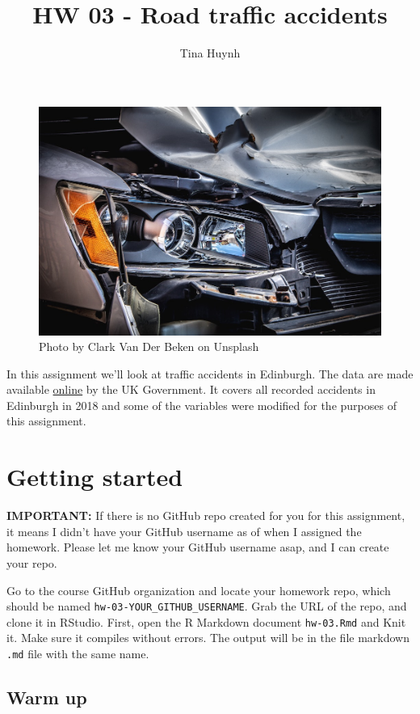 \documentclass[
]{article}
\title{HW 03 - Road traffic accidents}
\author{Tina Huynh}
\date{}
\begin{document}
\maketitle

{
\setcounter{tocdepth}{2}
\tableofcontents
}
\begin{figure}
\includegraphics[width=0.8\linewidth]{img/accident} \caption{Photo by Clark Van Der Beken on Unsplash}\label{fig:photo}
\end{figure}

In this assignment we'll look at traffic accidents in Edinburgh. The
data are made available
\href{https://data.gov.uk/dataset/cb7ae6f0-4be6-4935-9277-47e5ce24a11f/road-safety-data/datafile/36f1658e-b709-47e7-9f56-cca7aefeb8fe/preview}{online}
by the UK Government. It covers all recorded accidents in Edinburgh in
2018 and some of the variables were modified for the purposes of this
assignment.

\section{Getting started}\label{getting-started}

\textbf{IMPORTANT:} If there is no GitHub repo created for you for this
assignment, it means I didn't have your GitHub username as of when I
assigned the homework. Please let me know your GitHub username asap, and
I can create your repo.

Go to the course GitHub organization and locate your homework repo,
which should be named \texttt{hw-03-YOUR\_GITHUB\_USERNAME}. Grab the
URL of the repo, and clone it in RStudio. First, open the R Markdown
document \texttt{hw-03.Rmd} and Knit it. Make sure it compiles without
errors. The output will be in the file markdown \texttt{.md} file with
the same name.

\subsection{Warm up}\label{warm-up}
\end{document}

